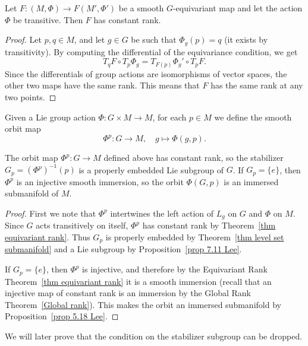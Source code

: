 \begin{thm}\label{thm equivariant rank}
    Let $F:(M,\Phi)\to F(M',\Phi')$ be a smooth $G$-equivariant map and let the action $\Phi$ be transitive. Then $F$ has constant rank.
\end{thm}
\begin{proof}
    Let $p,q\in M$, and let $g\in G$ be such that $\Phi_g(p)=q$ (it exists by transitivity). By computing the differential of the equivariance condition, we get
    \[T_qF\circ T_p\Phi_g=T_{F(p)}\Phi_g'\circ T_pF.\]
    Since the differentials of group actions are isomorphisms of vector spaces, the other two maps have the same rank. This means that $F$ has the same rank at any two points.
\end{proof}


\begin{defn}
    Given a Lie group action $\Phi:G\times M\to M$, for each $p\in M$ we define the smooth orbit map 
    \[\Phi^p:G\to M,\quad g\mapsto \Phi(g,p).\]
\end{defn}

\begin{prop}
    The orbit map $\Phi^p:G\to M$ defined above has constant rank, so the stabilizer $G_p=(\Phi^p)^{-1}(p)$ is a properly embedded Lie subgroup of $G$. If $G_p=\{e\}$, then $\Phi^p$ is an injective smooth immersion, so the orbit $\Phi(G,p)$ is an immersed submanifold of $M$.
\end{prop}
\begin{proof}
    First we note that $\Phi^p$ intertwines the left action of $L_g$ on $G$ and $\Phi$ on $M$. Since $G$ acts transitively on itself, $\Phi^p$ has constant rank by Theorem~\ref{thm equivariant rank}. Thus $G_p$ is properly embedded by Theorem~\ref{thm level set submanifold} and a Lie subgroup by Proposition~\ref{prop 7.11 Lee}.

    If $G_p=\{e\}$, then $\Phi^p$ is injective, and therefore by the Equivariant Rank Theorem~\ref{thm equivariant rank} it is a smooth immersion (recall that an injective map of constant rank is an immersion by the Global Rank Theorem~\ref{Global rank}). This makes the orbit an immersed submanifold by Proposition~\ref{prop 5.18 Lee}.
\end{proof}
\begin{rem}
    We will later prove that the condition on the stabilizer subgroup can be dropped.
\end{rem}

